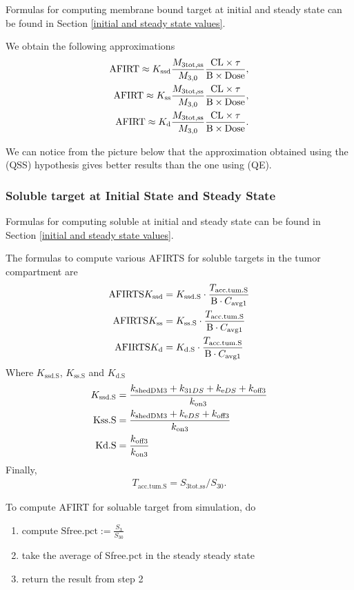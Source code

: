  

Formulas for computing membrane bound target at initial and steady state can be found in Section \ref{initial and steady state values}.

We obtain the following approximations 
\begin{align*}
\text{AFIRT} \approx K_\text{ssd}\frac{M_{3\text{tot,ss}}}{M_{3,0}}\frac{\text{CL}\times\tau}{\text{B}\times\text{Dose}},\\
\text{AFIRT} \approx K_\text{ss}\frac{M_{3\text{tot,ss}}}{M_{3,0}}\frac{\text{CL}\times\tau}{\text{B}\times\text{Dose}},\\
\text{AFIRT} \approx K_\text{d}\frac{M_{3\text{tot,ss}}}{M_{3,0}}\frac{\text{CL}\times\tau}{\text{B}\times\text{Dose}}.
\end{align*}  

We can notice from the picture below that the approximation obtained using the (QSS) hypothesis gives better results than the one using (QE).



\subsubsection{Soluble target at Initial State and Steady State}



Formulas for computing soluble at initial and steady state can be found in Section \ref{initial and steady state values}.

The formulas to compute various AFIRTS for soluble targets in the tumor compartment are 
\begin{align}
    \text{AFIRTS}K_\text{ssd} & = K_{\text{ssd.S}}\cdot \frac{T_{\text{acc.tum.S}}}{\text{B}\cdot C_{\text{avg}1}} \\
   \text{AFIRTS}K_\text{ss} & = K_{\text{ss.S}}\cdot \frac{T_{\text{acc.tum.S}}}{\text{B}\cdot C_{\text{avg}1}} \\
     \text{AFIRTS}K_\text{d} & = K_{\text{d.S}}\cdot \frac{T_{\text{acc.tum.S}}}{\text{B}\cdot C_{\text{avg}1}} \\
\end{align}
Where $K_{\text{ssd.S}}$, $K_{\text{ss.S}}$ and $K_{\text{d.S}}$
\begin{align}
    K_{\text{ssd.S}} & = \frac{k_{\text{shedDM}3} + k_{31DS} + k_{\text{e}DS} + k_{\text{off}3}}{k_{\text{on}3}} \\
    \text{Kss.S}  & = \frac{k_{\text{shedDM}3} + k_{\text{e}DS} + k_{\text{off}3}}{k_{\text{on}3}} \\
    \text{Kd.S}   & = \frac{k_{\text{off}3}}{k_{\text{on}3}} \\
\end{align}
 Finally,
\begin{align}
    T_{\text{acc.tum.S}} = S_{\text{3tot.ss}} / S_{30}.
\end{align}


To compute AFIRT for soluable target from simulation, do
\begin{enumerate}
\item compute $\text{Sfree.pct}:=\frac{S_3}{S_{30}}$
\item take the average of Sfree.pct in the steady steady state
\item return the result from step 2
\end{enumerate}
